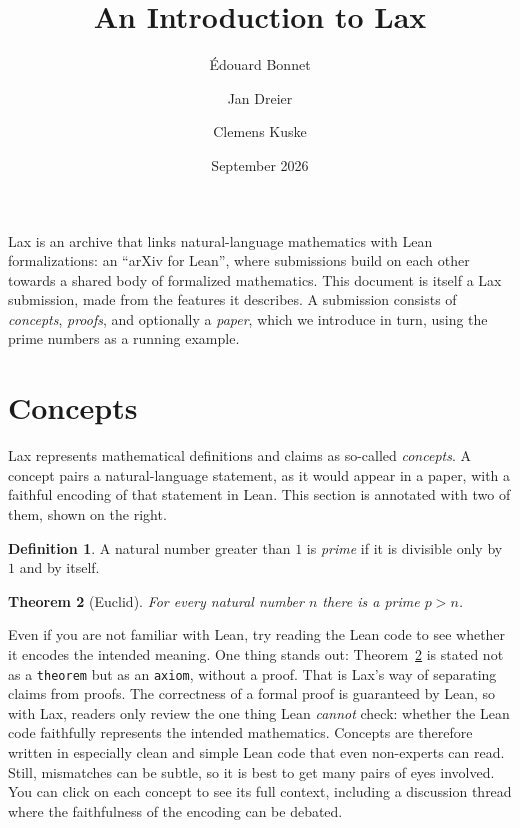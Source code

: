 \documentclass[11pt]{article}
\title{An Introduction to Lax}
\author{\'Edouard Bonnet \and Jan Dreier \and Clemens Kuske}
\date{September 2026}
\theoremstyle{plain}
\newtheorem{theorem}{Theorem}
\theoremstyle{definition}
\newtheorem{definition}[theorem]{Definition}
\begin{document}
\maketitle

\noindent
Lax is an archive that links natural-language mathematics with Lean
formalizations: an ``arXiv for Lean'', where submissions build on each other
towards a shared body of formalized mathematics.
This document is itself a Lax submission, made from the features it describes.
A submission consists of \emph{concepts}, \emph{proofs}, and optionally a
\emph{paper}, which we introduce in turn, using the prime numbers as a running
example.

\section{Concepts}

Lax represents mathematical definitions and claims as so-called
\emph{concepts}. A concept pairs a natural-language statement, as it would
appear in a paper, with a faithful encoding of that statement in Lean. This
section is annotated with two of them, shown on the right.

\begin{definition}\label{def:prime}
  A natural number greater than $1$ is \emph{prime} if it is divisible only
  by $1$ and by itself.
\end{definition}

\begin{theorem}[Euclid]\label{thm:euclid}
  For every natural number $n$ there is a prime $p > n$.
\end{theorem}

Even if you are not familiar with Lean, try reading the Lean code to see
whether it encodes the intended meaning. One thing stands out:
Theorem~\ref{thm:euclid} is stated not as a \texttt{theorem} but as an
\texttt{axiom}, without a proof. That is Lax's way of separating claims from
proofs. The correctness of a formal proof is guaranteed by Lean, so with Lax,
readers only review the one thing Lean \emph{cannot} check: whether the Lean
code faithfully represents the intended mathematics. Concepts are therefore
written in especially clean and simple Lean code that even non-experts can
read. Still, mismatches can be subtle, so it is best to get many pairs of eyes
involved. You can click on each concept to see its full context, including a
discussion thread where the faithfulness of the encoding can be debated.
\end{document}
